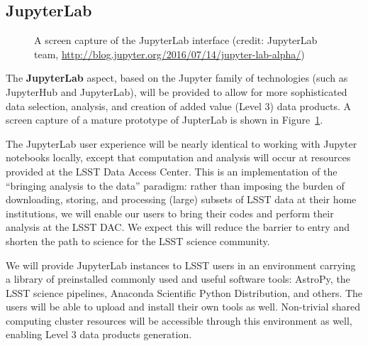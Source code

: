 \documentclass[DM,lsstdraft,toc]{lsstdoc}
\begin{document}
\subsection{JupyterLab\label{sec:jupyter}}

\begin{figure}
	\centering
	\caption{A screen capture of the JupyterLab interface (credit: JupyterLab team, \url{http://blog.jupyter.org/2016/07/14/jupyter-lab-alpha/})
		\label{fig:JupyterLab}}
\end{figure}

The {\bf JupyterLab} aspect, based on the Jupyter family of technologies (such as
JupyterHub and JupyterLab), will be provided to allow for more sophisticated
data selection, analysis, and creation of added value (Level 3) data
products. A screen capture of a mature prototype of JupterLab is shown in 
Figure~\ref{fig:JupyterLab}.

The JupyterLab user experience will be nearly identical to working with
Jupyter notebooks locally, except that computation and analysis will occur
at resources provided at the LSST Data Access Center.  This is an
implementation of the “bringing analysis to the data” paradigm: rather
than imposing the burden of downloading, storing, and processing (large)
subsets of LSST data at their home institutions, we will enable our users to
bring their codes and perform their analysis at the LSST DAC.  We expect
this will reduce the barrier to entry and shorten the path to science for
the LSST science community.

We will provide JupyterLab instances to LSST users in an environment carrying a 
library of preinstalled commonly used and useful software tools:
AstroPy, the LSST science pipelines, Anaconda Scientific Python Distribution,
and others. The users will be able to upload and install their own tools as well.
Non-trivial shared computing cluster resources will be accessible through this
environment as well, enabling Level 3 data products generation.
\end{document}
